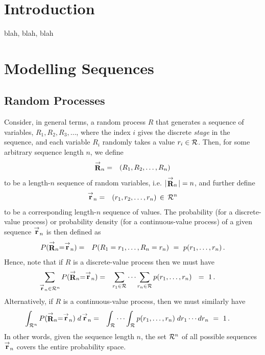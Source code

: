 \documentclass{report}
\begin{document}
\chapter{Introduction}
blah, blah, blah

\chapter{Modelling Sequences}
\section{Random Processes}
\label{sec:random-processes}
Consider, in general terms, a random process $R$ that generates a sequence of variables,
$R_1,R_2,R_3,\ldots$, where the index $i$ gives the discrete {\em stage} in the sequence,
and each variable $R_i$ randomly takes a value $r_i\in{\cal R}$.
Then, for some arbitrary sequence length $n$, we define
\begin{eqnarray}
\stackrel{\rightarrow}{\bf R}_n & = & (R_1,R_2,\ldots,R_n)
\end{eqnarray}
 to be a length-$n$ sequence
of random variables, i.e. $|\!\stackrel{\rightarrow}{\bf R}_n\!|=n$,
and further define
\begin{eqnarray}
\stackrel{\rightarrow}{\bf r}_n & = & (r_1,r_2,\ldots,r_n)\,\in\,{\cal R}^n
\end{eqnarray}
to be a corresponding length-$n$ sequence of values.
The probability (for a discrete-value process) or probability density (for a continuous-value process) 
of a given sequence $\stackrel{\rightarrow}{\bf r}_n$ is then defined as
\begin{eqnarray}
P(\stackrel{\rightarrow}{\bf R}_n=\stackrel{\rightarrow}{\bf r}_n)
& = & P(R_1=r_1,\ldots,R_n=r_n)~=~p(r_1,\ldots,r_n)\,.
\end{eqnarray}
Hence, note that if $R$ is a discrete-value process then we must have
\begin{eqnarray}
\hspace*{-5mm}
\sum_{\stackrel{\rightarrow}{\bf r}_n\in{\cal R}^n}
P(\stackrel{\rightarrow}{\bf R}_n=\stackrel{\rightarrow}{\bf r}_n)
& = & \sum_{r_1\in{\cal R}}\cdots\sum_{r_n\in{\cal R}}
p(r_1,\ldots,r_n)~~=~1\,.
\end{eqnarray}
Alternatively, if $R$ is a continuous-value process, then we must similarly have
\begin{eqnarray}
\hspace*{-5mm}
\int_{{\cal R}^n}
P(\stackrel{\rightarrow}{\bf R}_n=\stackrel{\rightarrow}{\bf r}_n)
\;d\!\stackrel{\rightarrow}{\bf r}_n
& = & \int_{\cal R}\cdots\int_{\cal R}
p(r_1,\ldots,r_n)\;dr_1\cdots dr_n
~=~1\,.
\end{eqnarray}
In other words, given the sequence length $n$, the set ${\cal R}^n$ of all possible sequences
$\stackrel{\rightarrow}{\bf r}_n$ covers the entire probability space.
\end{document}
